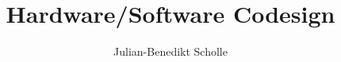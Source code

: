 \documentclass[11pt,twoside,a4paper]{mpreport}
\title{Hardware/Software Codesign}
\author{Julian-Benedikt Scholle}
\begin{document}
\maketitle
\newpage
\newpage
\tableofcontents















\listoffigures

{}



\end{document}
